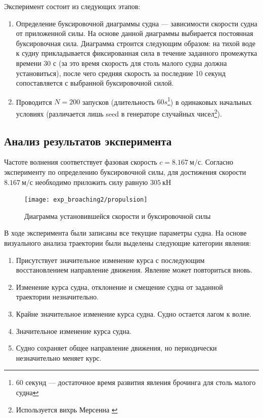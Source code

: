 Эксперимент состоит из следующих этапов:
\begin{enumerate}
	\item	Определение буксировочной диаграммы судна --- зависимости скорости судна от приложенной силы. 
			На основе данной диаграммы выбирается постоянная буксировочная сила. 
			Диаграмма строится следующим образом: на тихой воде к судну прикладывается фиксированная 
			сила в течение заданного промежутка времени 30 с 
			(за это время скорость для столь малого судна 
			должна установиться), после чего средняя скорость за последние 10 секунд 
			сопоставляется с выбранной буксировочной силой.
	\item	Проводится $N=200$ запусков (длительность $60 s$\footnote{60 секунд --- достаточное время развития явления брочинга для столь малого судна}) в одинаковых начальных условиях (различается лишь seed в генераторе случайных чисел\footnote{Используется вихрь Мерсенна \citep{mersenn_twister}}).
\end{enumerate}



\subsection{Анализ результатов эксперимента}

Частоте волнения соответствует фазовая скорость $c = 8.167\ \text{м/с}$.
Согласно эксперименту по определению буксировочной силы, для достижения скорости $8.167\ \text{м/с}$ необходимо приложить силу равную $305\ \text{кН}$

\begin{figure}[ht]
	\begin{center}
	\texttt{[image: exp\_broaching2/propulsion]}
	\end{center}
	\caption{Диаграмма установившейся скорости и буксировочной силы}
	\label{tug_force}
\end{figure}

В ходе эксперимента были записаны все текущие параметры судна. На основе визуального анализа траектории были выделены следующие категории явления:

\begin{enumerate}
	\item	Присутствует значительное изменение курса с последующим восстановлением направление движения. 
			Явление может повториться вновь.
	\item	Изменение курса судна, отклонение и смещение судна от заданной траектории незначительно.
	\item	Крайне значительное изменение курса судна. Судно остается лагом к волне.
	\item	Значительное изменение курса судна.
	\item	Судно сохраняет общее направление движения, но периодически незначительно меняет курс.
\end{enumerate}

